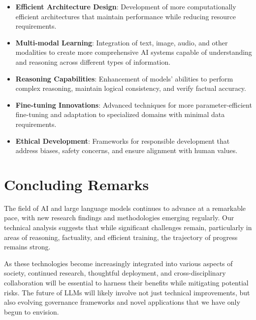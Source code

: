 \documentclass[11pt,a4paper]{report}
\begin{document}
\begin{itemize}
    \item \textbf{Efficient Architecture Design}: Development of more computationally efficient architectures that maintain performance while reducing resource requirements.
    
    \item \textbf{Multi-modal Learning}: Integration of text, image, audio, and other modalities to create more comprehensive AI systems capable of understanding and reasoning across different types of information.
    
    \item \textbf{Reasoning Capabilities}: Enhancement of models' abilities to perform complex reasoning, maintain logical consistency, and verify factual accuracy.
    
    \item \textbf{Fine-tuning Innovations}: Advanced techniques for more parameter-efficient fine-tuning and adaptation to specialized domains with minimal data requirements.
    
    \item \textbf{Ethical Development}: Frameworks for responsible development that address biases, safety concerns, and ensure alignment with human values.
\end{itemize}

\section{Concluding Remarks}

The field of AI and large language models continues to advance at a remarkable pace, with new research findings and methodologies emerging regularly. Our technical analysis suggests that while significant challenges remain, particularly in areas of reasoning, factuality, and efficient training, the trajectory of progress remains strong.

As these technologies become increasingly integrated into various aspects of society, continued research, thoughtful deployment, and cross-disciplinary collaboration will be essential to harness their benefits while mitigating potential risks. The future of LLMs will likely involve not just technical improvements, but also evolving governance frameworks and novel applications that we have only begun to envision.
\end{document}
